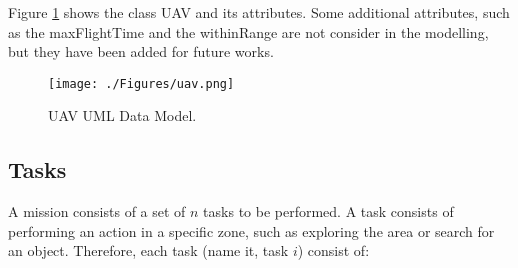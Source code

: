 Figure \ref{fig:uav} shows the class UAV and its attributes. Some additional attributes, such as the maxFlightTime and the withinRange are not consider in the modelling, but they have been added for future works.

\begin{figure}[h]
\centering
\texttt{[image: ./Figures/uav.png]}
\caption{UAV UML Data Model.}
\label{fig:uav}
\end{figure}

\subsection{Tasks}
A mission consists of a set of $n$ tasks to be performed. A task consists of performing an action in a specific zone, such as exploring the area or search for an object. Therefore, each task (name it, task $i$) consist of:

